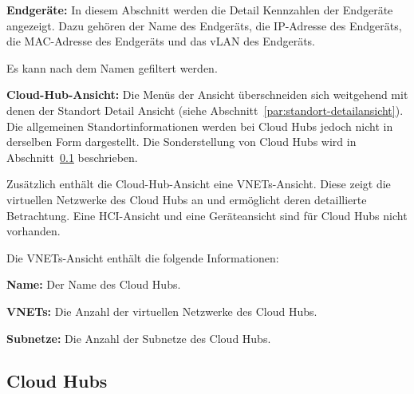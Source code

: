 \begin{compactitem}
\begin{compactitem}
\begin{compactitem}
\begin{compactitem}
\begin{compactitem}
                    \item \textbf{Endgeräte:} In diesem Abschnitt werden die Detail Kennzahlen der Endgeräte angezeigt.
                    Dazu gehören der Name des Endgeräts, die IP-Adresse des Endgeräts, die MAC-Adresse des Endgeräts und das vLAN des Endgeräts.
                \end{compactitem}
                
                Es kann nach dem Namen gefiltert werden.


            
            \end{compactitem}

            \item \textbf{Cloud-Hub-Ansicht:}
            \label{par:cloudhub-ansicht}
            Die Menüs der Ansicht überschneiden sich weitgehend mit denen der
            Standort Detail Ansicht (siehe Abschnitt~\ref{par:standort-detailansicht}).
            Die allgemeinen Standortinformationen werden bei Cloud Hubs jedoch nicht
            in derselben Form dargestellt. Die Sonderstellung von Cloud Hubs wird in
            Abschnitt~\ref{sec:cloudhubs} beschrieben.

            Zusätzlich enthält die Cloud-Hub-Ansicht eine VNETs-Ansicht. Diese zeigt
            die virtuellen Netzwerke des Cloud Hubs an und ermöglicht deren detaillierte
            Betrachtung. Eine HCI-Ansicht und eine Geräteansicht sind für Cloud Hubs
            nicht vorhanden.

            Die VNETs-Ansicht enthält die folgende Informationen:
            \begin{compactitem}
                \item \textbf{Name:} Der Name des Cloud Hubs.
                \item \textbf{VNETs:} Die Anzahl der virtuellen Netzwerke des Cloud Hubs.
                \item \textbf{Subnetze:} Die Anzahl der Subnetze des Cloud Hubs.
            \end{compactitem}
        \end{compactitem}

    \end{compactitem}

\end{compactitem}


\subsection{Cloud Hubs}
\label{sec:cloudhubs}

